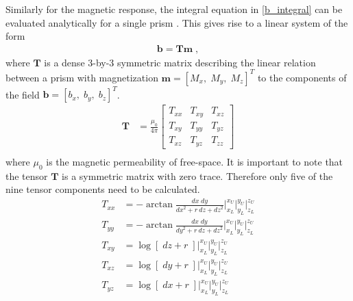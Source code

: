 Similarly for the magnetic response, the integral equation in \eqref{b_integral} can be evaluated analytically for a single prism \cite[]{Sharma66}. This gives rise to a linear system of the form
\begin{equation}\label{b_discrete}
\begin{split}
	\mathbf{b} = \mathbf{T} \mathbf{m} \;,
\end{split}
\end{equation}
where $\mathbf{T}$ is a dense 3-by-3 symmetric matrix describing the linear relation between a prism with magnetization $\mathbf{m} = [M_x,\;M_y,\;M_z]^T$ to the components of the field $\mathbf{b} = [b_x,\;b_y,\;b_z]^T$.
\begin{equation}
\begin{split}
\mathbf{T} & = \frac{\mu_0}{4\pi} \begin{bmatrix} T_{xx}& T_{xy}& T_{xz} \\T_{xy} & T_{yy} & T_{yz} \\ T_{xz}&T_{yz} & T_{zz} \end{bmatrix} \\
\end{split}
\label{Tmatrix}
\end{equation}
where $\mu_0$ is the magnetic permeability of free-space. It is important to note that the tensor $\mathbf{T}$ is a symmetric matrix with zero trace. Therefore only five of the nine tensor components need to be calculated.
\begin{equation}
\begin{split}
T_{xx} &= -\arctan \frac{dx\;dy}{{dx}^2 + r\:dz + {dz}^2} \bigg|_{x_L}^{x_U} \bigg|_{y_L}^{y_U} \bigg|_{z_L}^{z_U} \\
T_{yy} &= -\arctan \frac{dx\;dy}{{dy}^2 + r\:dz + {dz}^2} \bigg|_{x_L}^{x_U} \bigg|_{y_L}^{y_U} \bigg|_{z_L}^{z_U} \\
T_{xy} &= \log \left[\; dz + r\;\right] \bigg|_{x_L}^{x_U} \bigg|_{y_L}^{y_U} \bigg|_{z_L}^{z_U}\\
T_{xz} &= \log \left[\; dy + r\;\right] \bigg|_{x_L}^{x_U} \bigg|_{y_L}^{y_U} \bigg|_{z_L}^{z_U}\\
T_{yz} &= \log \left[\; dx + r\;\right] \bigg|_{x_L}^{x_U} \bigg|_{y_L}^{y_U} \bigg|_{z_L}^{z_U}\\
\end{split}
\end{equation}


